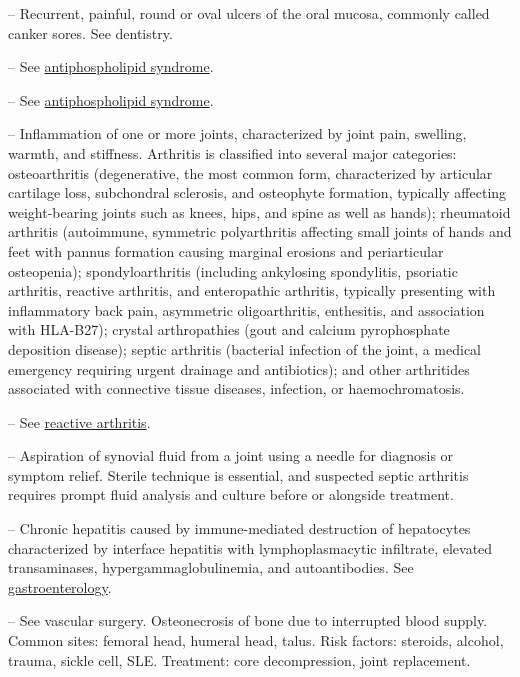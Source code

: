 -- Recurrent, painful, round or oval ulcers of the oral mucosa, commonly called canker sores. See dentistry.

-- See \hyperlink{Antiphospholipid Syndrome}{antiphospholipid syndrome}.

-- See \hyperlink{Antiphospholipid Syndrome}{antiphospholipid syndrome}.

-- Inflammation of one or more joints, characterized by joint pain, swelling, warmth, and stiffness. Arthritis is classified into several major categories: osteoarthritis (degenerative, the most common form, characterized by articular cartilage loss, subchondral sclerosis, and osteophyte formation, typically affecting weight-bearing joints such as knees, hips, and spine as well as hands); rheumatoid arthritis (autoimmune, symmetric polyarthritis affecting small joints of hands and feet with pannus formation causing marginal erosions and periarticular osteopenia); spondyloarthritis (including ankylosing spondylitis, psoriatic arthritis, reactive arthritis, and enteropathic arthritis, typically presenting with inflammatory back pain, asymmetric oligoarthritis, enthesitis, and association with HLA-B27); crystal arthropathies (gout and calcium pyrophosphate deposition disease); septic arthritis (bacterial infection of the joint, a medical emergency requiring urgent drainage and antibiotics); and other arthritides associated with connective tissue diseases, infection, or haemochromatosis.

-- See \hyperlink{Reactive Arthritis}{reactive arthritis}.

-- Aspiration of synovial fluid from a joint using a needle for diagnosis or symptom relief. Sterile technique is essential, and suspected septic arthritis requires prompt fluid analysis and culture before or alongside treatment.

-- Chronic hepatitis caused by immune-mediated destruction of hepatocytes characterized by interface hepatitis with lymphoplasmacytic infiltrate, elevated transaminases, hypergammaglobulinemia, and autoantibodies. See \hyperlink{Gastroenterology}{gastroenterology}.

-- See vascular surgery. Osteonecrosis of bone due to interrupted blood supply. Common sites: femoral head, humeral head, talus. Risk factors: steroids, alcohol, trauma, sickle cell, SLE. Treatment: core decompression, joint replacement.

